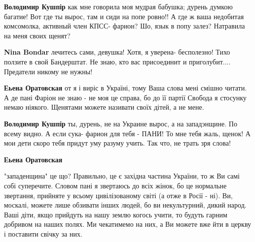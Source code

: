 \begin{itemize}
\begin{itemize}
\begin{itemize}
\textbf{Володимир Кушпір} как мне говорила моя мудрая бабушка; дурень думкою багатие! Вот где ты вырос, там и сиди на попе ровно!! А где ж ваша недобитая комсомолка, активный член КПСС- фарион? Шо, язык в попу залез? Натравила на меня своих щенят?

 
\textbf{Nina Bondar} лечитесь сами, девушка! Хотя, я уверена- бесполезно! Тихо ползите в свой Бандерштат. Не знаю, кто вас присоединит и приголубит.... Предатели никому не нужны!

 
\textbf{Еьена Оратовская} от я і виріс в Україні, тому Ваша слова мені смішно читати. А де пані Фаріон не знаю - не моя це справа, бо до її партії Свобода я стосунку немаю ніякого. Щенятами можете називати своїх дітей, а не мене.

 
\textbf{Володимир Кушпір} ты, дурень, не на Украине вырос, а на западэнщине. По всему видно. А если сука- фарион для тебя - ПАНИ! То мне тебя жаль, щенок! А мои дети скоро тебя придут уму разуму учить. Так что, не трать зря слова!

 
\textbf{Еьена Оратовская} 

"западенщина" це що? Правильно, це є західна частина
України, то ж Ви самі собі суперечите. Словом пані я звертаюсь до всіх жінок,
бо це нормальне звертання, прийняте у всьому цивілізованому світі (а отже в
Росії - ні). Ви, москалі, можете лише обзивати інших людей, бо ви некультурний,
дикий народ. Ваші діти, якщо прийдуть на нашу землю когось учити, то будуть
гарним добривом на наших полях. Ми чекатимемо на них, а Ви можете вже йти в
церкву і поставити свічку за них.


\end{itemize}
\end{itemize}
\end{itemize}
